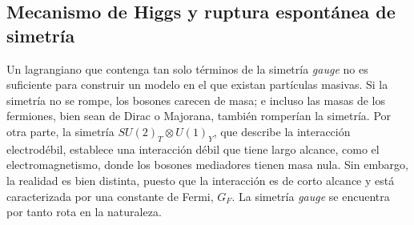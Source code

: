 \color{new}
\subsection{Mecanismo de Higgs y ruptura espontánea de simetría}
\label{sec_higgsmecha}

Un lagrangiano que contenga tan solo términos de la simetría \emph{gauge} no es suficiente para construir un modelo en el que existan partículas masivas. Si la simetría no se rompe, los bosones carecen de masa; e incluso las masas de los fermiones, bien sean de Dirac o Majorana, también romperían la simetría.
Por otra parte, la simetría $SU(2)_T \otimes U(1)_Y$, que describe la interacción electrodébil, establece una interacción débil que tiene largo alcance, como el electromagnetismo, donde los bosones mediadores tienen masa nula.
Sin embargo, la realidad es bien distinta, puesto que la interacción es de corto alcance 
y está caracterizada por una constante de Fermi,
$G_F$. La simetría \emph{gauge} se encuentra por tanto rota en la naturaleza.


